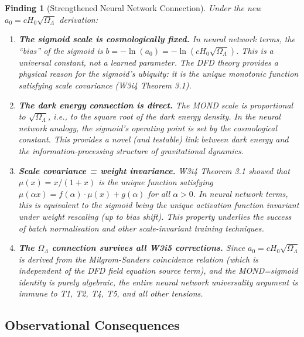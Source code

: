 \documentclass[11pt]{article}
\newtheorem{finding}[theorem]{Finding}
\theoremstyle{definition}
\theoremstyle{remark}
\newcommand{\mufd}{\mu}
\begin{document}
\begin{finding}[Strengthened Neural Network Connection]
\label{finding:nn-connection}
Under the new $a_0 = cH_0\sqrt{\Omega_\Lambda}$ derivation:

\begin{enumerate}
  \item \textbf{The sigmoid scale is cosmologically fixed.}
    In neural network terms, the ``bias'' of the sigmoid is
    $b = -\ln(a_0) = -\ln(cH_0\sqrt{\Omega_\Lambda})$.  This is a
    universal constant, not a learned parameter.  The DFD theory
    provides a physical reason for the sigmoid's ubiquity:
    it is the unique monotonic function satisfying scale covariance
    (W3i4 Theorem 3.1).

  \item \textbf{The dark energy connection is direct.}
    The MOND scale is proportional to $\sqrt{\Omega_\Lambda}$, i.e.,
    to the square root of the dark energy density.  In the neural
    network analogy, the sigmoid's operating point is set by the
    cosmological constant.  This provides a novel (and testable)
    link between dark energy and the information-processing structure
    of gravitational dynamics.

  \item \textbf{Scale covariance = weight invariance.}
    W3i4 Theorem 3.1 showed that $\mufd(x) = x/(1+x)$ is the unique
    function satisfying $\mufd(\alpha x) = f(\alpha)\cdot\mufd(x) +
    g(\alpha)$ for all $\alpha > 0$.  In neural network terms, this
    is equivalent to the sigmoid being the unique activation function
    invariant under weight rescaling (up to bias shift).  This
    property underlies the success of batch normalisation and other
    scale-invariant training techniques.

  \item \textbf{The $\Omega_\Lambda$ connection survives all W3i5 corrections.}
    Since $a_0 = cH_0\sqrt{\Omega_\Lambda}$ is derived from the
    Milgrom-Sanders coincidence relation (which is independent of
    the DFD field equation source term), and the MOND=sigmoid identity
    is purely algebraic, the entire neural network universality
    argument is immune to T1, T2, T4, T5, and all other tensions.
\end{enumerate}
\end{finding}

\subsection{Observational Consequences}
\label{sec:sigmoid-observational}
\end{document}
